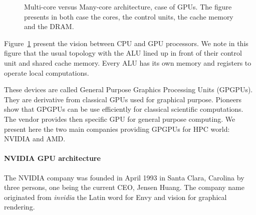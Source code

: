 \begin{figure}
\begin{center}
\hspace{1cm}
\end{center}
\caption[Multi-core versus Many-core architectures]{Multi-core versus Many-core architecture, case of GPUs. The figure presents in both case the cores, the control units, the cache memory and the DRAM.}
\label{fig:2_HARD:gpu}
\end{figure}

Figure~\ref{fig:2_HARD:gpu} present the vision between CPU and GPU processors. 
We note in this figure that the usual topology with the ALU lined up in front of their control unit and shared cache memory. 
Every ALU has its own memory and registers to operate local computations. 

These devices are called General Purpose Graphics Processing Units (GPGPUs). 
They are derivative from classical GPUs used for graphical purpose.
Pioneers show that GPGPUs can be use efficiently for classical scientific computations.
The vendor provides then specific GPU for general purpose computing.  
We present here the two main companies providing GPGPUs for HPC world: NVIDIA and AMD.

\paragraph{NVIDIA GPU architecture}
The NVIDIA company was founded in April 1993 in Santa Clara, Carolina by three persons, one being the current CEO, Jensen Huang.
The company name originated from \textit{invidia} the Latin word for Envy and vision for graphical rendering. 

